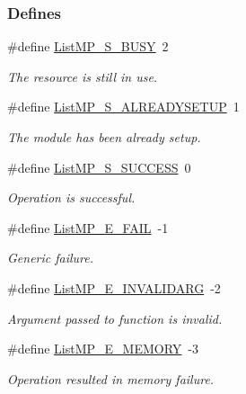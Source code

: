 \subsubsection*{Defines}
\begin{DoxyCompactItemize}
\item 
\#define \hyperlink{_list_m_p_8h_aae3ea24c5161e44b42c0a2c6f73fd3d2}{ListMP\_\-S\_\-BUSY}~2
\begin{DoxyCompactList}\small\item\em The resource is still in use. \item\end{DoxyCompactList}\item 
\#define \hyperlink{_list_m_p_8h_ae2dbc4743a0ddc0c4aaded37551cf25e}{ListMP\_\-S\_\-ALREADYSETUP}~1
\begin{DoxyCompactList}\small\item\em The module has been already setup. \item\end{DoxyCompactList}\item 
\#define \hyperlink{_list_m_p_8h_a67e97f10cd480f457375e9a20bb41e27}{ListMP\_\-S\_\-SUCCESS}~0
\begin{DoxyCompactList}\small\item\em Operation is successful. \item\end{DoxyCompactList}\item 
\#define \hyperlink{_list_m_p_8h_a4aa4e08eddd7d36b42395070f21125df}{ListMP\_\-E\_\-FAIL}~-\/1
\begin{DoxyCompactList}\small\item\em Generic failure. \item\end{DoxyCompactList}\item 
\#define \hyperlink{_list_m_p_8h_a0cfe16cd038629372772230866ef681f}{ListMP\_\-E\_\-INVALIDARG}~-\/2
\begin{DoxyCompactList}\small\item\em Argument passed to function is invalid. \item\end{DoxyCompactList}\item 
\#define \hyperlink{_list_m_p_8h_ae855742ffb668b39109633d3a3fe552c}{ListMP\_\-E\_\-MEMORY}~-\/3
\begin{DoxyCompactList}\small\item\em Operation resulted in memory failure. \item\end{DoxyCompactList}\item 

\end{DoxyCompactItemize}
